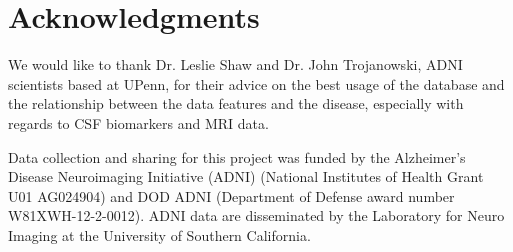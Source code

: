 \documentclass{article}
\begin{document}
%
%
%
%

 
\section*{Acknowledgments} 
 
We would like to thank Dr. Leslie Shaw and Dr. John Trojanowski, ADNI scientists based at UPenn, for their advice on the best usage of the database and the relationship between the data features and the disease, especially with regards to CSF biomarkers and MRI data. 

Data collection and sharing for this project was funded by the Alzheimer's Disease Neuroimaging Initiative (ADNI) (National Institutes of Health Grant U01 AG024904) and DOD ADNI (Department of Defense award number W81XWH-12-2-0012). ADNI data are disseminated by the Laboratory for Neuro Imaging at the University of Southern California.



\end{document}
